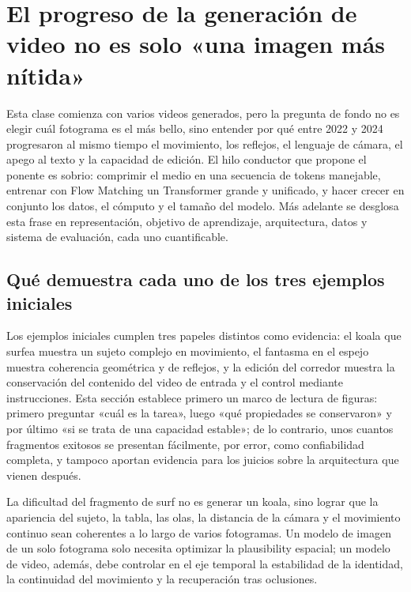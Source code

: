 \section{El progreso de la generación de video no es solo «una imagen más nítida»}

Esta clase comienza con varios videos generados, pero la pregunta de fondo no es elegir cuál fotograma es el más bello, sino entender por qué entre 2022 y 2024 progresaron al mismo tiempo el movimiento, los reflejos, el lenguaje de cámara, el apego al texto y la capacidad de edición. El hilo conductor que propone el ponente es sobrio: comprimir el medio en una secuencia de tokens manejable, entrenar con Flow Matching un Transformer grande y unificado, y hacer crecer en conjunto los datos, el cómputo y el tamaño del modelo. Más adelante se desglosa esta frase en representación, objetivo de aprendizaje, arquitectura, datos y sistema de evaluación, cada uno cuantificable.

\subsection{Qué demuestra cada uno de los tres ejemplos iniciales}

Los ejemplos iniciales cumplen tres papeles distintos como evidencia: el koala que surfea muestra un sujeto complejo en movimiento, el fantasma en el espejo muestra coherencia geométrica y de reflejos, y la edición del corredor muestra la conservación del contenido del video de entrada y el control mediante instrucciones. Esta sección establece primero un marco de lectura de figuras: primero preguntar «cuál es la tarea», luego «qué propiedades se conservaron» y por último «si se trata de una capacidad estable»; de lo contrario, unos cuantos fragmentos exitosos se presentan fácilmente, por error, como confiabilidad completa, y tampoco aportan evidencia para los juicios sobre la arquitectura que vienen después.


La dificultad del fragmento de surf no es generar un koala, sino lograr que la apariencia del sujeto, la tabla, las olas, la distancia de la cámara y el movimiento continuo sean coherentes a lo largo de varios fotogramas. Un modelo de imagen de un solo fotograma solo necesita optimizar la plausibility espacial; un modelo de video, además, debe controlar en el eje temporal la estabilidad de la identidad, la continuidad del movimiento y la recuperación tras oclusiones.


